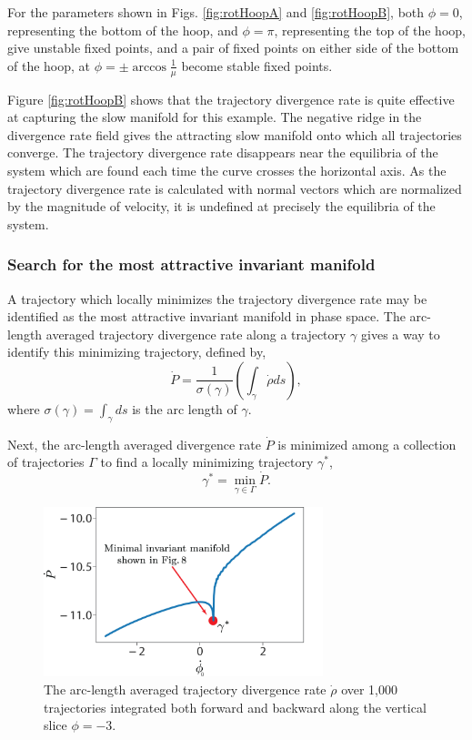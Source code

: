 \documentclass[twocolumn]{svjour3}
\newcommand{\edit}[3]{{\color{red} #2}}
\begin{document}
For the parameters shown in Figs. \ref{fig:rotHoopA} and \ref{fig:rotHoopB}, both $\phi=0$, representing the bottom of the hoop, and $\phi=\pi$, representing the top of the hoop, give unstable fixed points, and a pair of fixed points on either side of the bottom of the hoop, at $\phi=\pm\arccos\tfrac{1}{\mu}$ become stable fixed points.

Figure \ref{fig:rotHoopB} shows that the trajectory divergence rate is quite effective at capturing the slow manifold for this example. The \edit{red curve}{negative ridge in the divergence rate field}{19} gives the attracting slow manifold onto which all trajectories converge. The trajectory divergence rate disappears near the equilibria of the system which are found each time the curve crosses the horizontal axis. As the trajectory divergence rate is calculated with normal vectors which are normalized by the magnitude of velocity, it is undefined at precisely the equilibria of the system.

\subsubsection{Search for the most attractive invariant manifold}
\edit{The}{A}{20} trajectory which \edit{}{locally}{20} minimizes the trajectory divergence rate may be identified as the most attractive invariant manifold in phase space. The arc-length averaged trajectory divergence rate along a trajectory $\gamma$ gives a way to identify this minimizing trajectory, defined by,
\begin{equation}
\dot{P}=\frac{1}{\sigma(\gamma)}\left(\int_\gamma\dot{\rho}ds\right),
\end{equation}
where $\sigma(\gamma)=\int_{\gamma}ds$ is the arc length of $\gamma$.

Next, the arc-length averaged divergence rate $\dot{P}$ is minimized among a collection of trajectories $\Gamma$ to find \edit{the}{a locally}{20} minimizing trajectory $\gamma^*$,
\begin{equation}\label{eq:minimum}
\gamma^*=\min_{\gamma\in\Gamma}\dot{P}.
\end{equation}
\begin{figure}
\centering
\includegraphics[width=3.2in]{Fig10}
\caption{The arc-length averaged trajectory divergence rate $\dot{\rho}$ over 1,000 trajectories integrated both forward and backward along the vertical slice $\phi=-3$.}
\label{fig:min-rhodot}
\end{figure}
\end{document}

